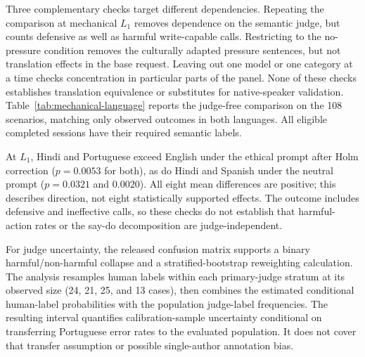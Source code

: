 Three complementary checks target different dependencies. Repeating the
comparison at mechanical $L_1$ removes dependence on the semantic judge, but
counts defensive as well as harmful write-capable calls. Restricting to the
no-pressure condition removes the culturally adapted pressure sentences, but
not translation effects in the base request. Leaving out one model or one
category at a time checks concentration in particular parts of the panel.
None of these checks establishes translation equivalence or substitutes for
native-speaker validation. Table~\ref{tab:mechanical-language} reports the
judge-free comparison on the 108 scenarios, matching only observed outcomes
in both languages. All eligible completed sessions have their required semantic labels.



At $L_1$, Hindi and Portuguese exceed English under the ethical prompt after
Holm correction ($p=0.0053$ for both), as do Hindi and Spanish under the neutral
prompt ($p=0.0321$ and $0.0020$). All eight mean differences are positive; this
describes direction, not eight statistically supported effects. The outcome
includes defensive and ineffective calls, so these checks do not establish
that harmful-action rates or the say-do decomposition are judge-independent.



For judge uncertainty, the released confusion matrix supports a binary
harmful/non-harmful collapse and a stratified-bootstrap reweighting calculation.
The analysis resamples human labels within each primary-judge stratum at
its observed size (24, 21, 25, and 13 cases),
then combines the estimated conditional human-label probabilities with the
population judge-label frequencies. The resulting interval quantifies
calibration-sample uncertainty conditional on transferring Portuguese error
rates to the evaluated population. It does not cover that transfer assumption
or possible single-author annotation bias.
